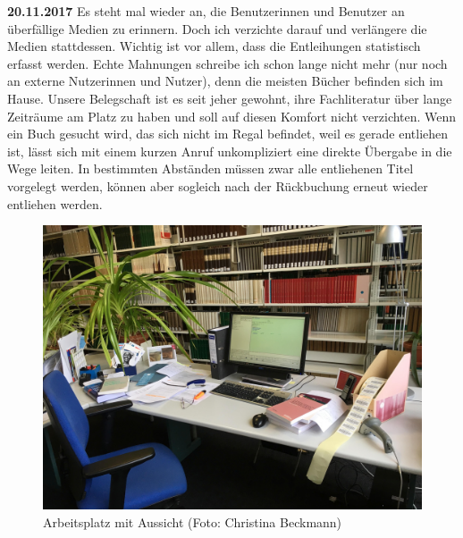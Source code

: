 \documentclass[a4paper,
fontsize=11pt,
oneside,
numbers=noperiodatend,
parskip=half-,
bibliography=totoc,
final
]{scrartcl}
\begin{document}
\textbf{20.11.2017} Es steht mal wieder an, die Benutzerinnen und
Benutzer an überfällige Medien zu erinnern. Doch ich verzichte darauf
und verlängere die Medien stattdessen. Wichtig ist vor allem, dass die
Entleihungen statistisch erfasst werden. Echte Mahnungen schreibe ich
schon lange nicht mehr (nur noch an externe Nutzerinnen und Nutzer),
denn die meisten Bücher befinden sich im Hause. Unsere Belegschaft ist
es seit jeher gewohnt, ihre Fachliteratur über lange Zeiträume am Platz
zu haben und soll auf diesen Komfort nicht verzichten. Wenn ein Buch
gesucht wird, das sich nicht im Regal befindet, weil es gerade entliehen
ist, lässt sich mit einem kurzen Anruf unkompliziert eine direkte
Übergabe in die Wege leiten. In bestimmten Abständen müssen zwar alle
entliehenen Titel vorgelegt werden, können aber sogleich nach der
Rückbuchung erneut wieder entliehen werden.

\begin{figure}
\centering
\includegraphics{img/Beckmann_1.jpg}
\caption{Arbeitsplatz mit Aussicht (Foto: Christina Beckmann)}
\end{figure}
\end{document}

